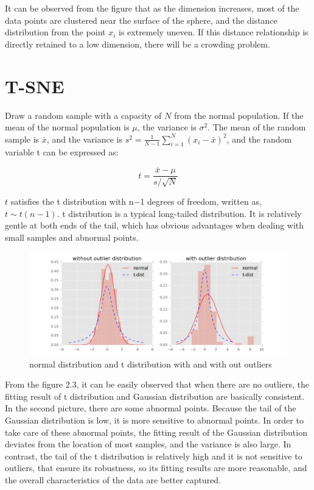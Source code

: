 \noindent It can be observed from the figure that as the dimension increases, most of the data points are clustered near the surface of the sphere, and the distance distribution from the point $x_i$ is extremely uneven. If this distance relationship is directly retained to a low dimension, there will be a crowding problem.

\section{T-SNE}
Draw a random sample with a capacity of $N$ from the normal population. If the mean of the normal population is $μ$, the variance is $\sigma^2$. The mean of the random sample is $\bar{x}$, and the variance is $s^2=  \frac {1}{N−1} \sum ^N_{i=1} (x_i−\bar{x})^2$, and the random variable t can be expressed as:

\begin{equation*}
    {t} =  \frac {\bar{x} - \mu}{s / \sqrt{N}} 
\end{equation*}

\noindent $t$ satisfies the t distribution with n−1 degrees of freedom, written as, $t∼t(n−1)$. t distribution is a typical long-tailed distribution. It is relatively gentle at both ends of the tail, which has obvious advantages when dealing with small samples and abnormal points.\\

\begin{figure}[ht]

\centering
\includegraphics[scale=0.6]{images/image_t-distribution.png}
\caption{normal distribution and t distribution with and with out outliers}
\label{fig:label}
\end{figure}

\noindent From the figure 2.3, it can be easily observed that when there are no outliers, the fitting result of t distribution and Gaussian distribution are basically consistent. In the second picture, there are some abnormal points. Because the tail of the Gaussian distribution is low, it is more sensitive to abnormal points. In order to take care of these abnormal points, the fitting result of the Gaussian distribution deviates from the location of most samples, and the variance is also large. In contrast, the tail of the t distribution is relatively high and it is not sensitive to outliers, that ensure its robustness, so its fitting results are more reasonable, and the overall characteristics of the data are better captured.\\


